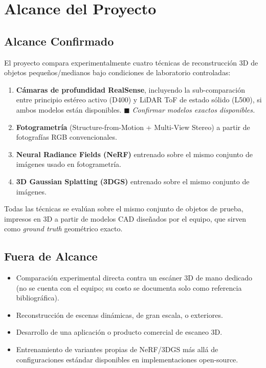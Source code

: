 \documentclass[11pt]{article}
\begin{document}
\section{Alcance del Proyecto}

\subsection{Alcance Confirmado}
El proyecto compara experimentalmente cuatro t\'ecnicas de reconstrucci\'on 3D de objetos peque\~nos/medianos bajo condiciones de laboratorio controladas:

\begin{enumerate}
    \item \textbf{C\'amaras de profundidad RealSense}, incluyendo la sub-comparaci\'on entre principio est\'ereo activo (D400) y LiDAR ToF de estado s\'olido (L500), si ambos modelos est\'an disponibles. $\blacksquare$ \emph{Confirmar modelos exactos disponibles.}
    \item \textbf{Fotogrametr\'ia} (Structure-from-Motion + Multi-View Stereo) a partir de fotograf\'ias RGB convencionales.
    \item \textbf{Neural Radiance Fields (NeRF)} entrenado sobre el mismo conjunto de im\'agenes usado en fotogrametr\'ia.
    \item \textbf{3D Gaussian Splatting (3DGS)} entrenado sobre el mismo conjunto de im\'agenes.
\end{enumerate}

Todas las t\'ecnicas se eval\'uan sobre el mismo conjunto de objetos de prueba, impresos en 3D a partir de modelos CAD dise\~nados por el equipo, que sirven como \emph{ground truth} geom\'etrico exacto.

\subsection*{Fuera de Alcance}
\begin{itemize}
    \item Comparaci\'on experimental directa contra un esc\'aner 3D de mano dedicado (no se cuenta con el equipo; su costo se documenta solo como referencia bibliogr\'afica).
    \item Reconstrucci\'on de escenas din\'amicas, de gran escala, o exteriores.
    \item Desarrollo de una aplicaci\'on o producto comercial de escaneo 3D.
    \item Entrenamiento de variantes propias de NeRF/3DGS m\'as all\'a de configuraciones est\'andar disponibles en implementaciones open-source.
\end{itemize}
\end{document}
